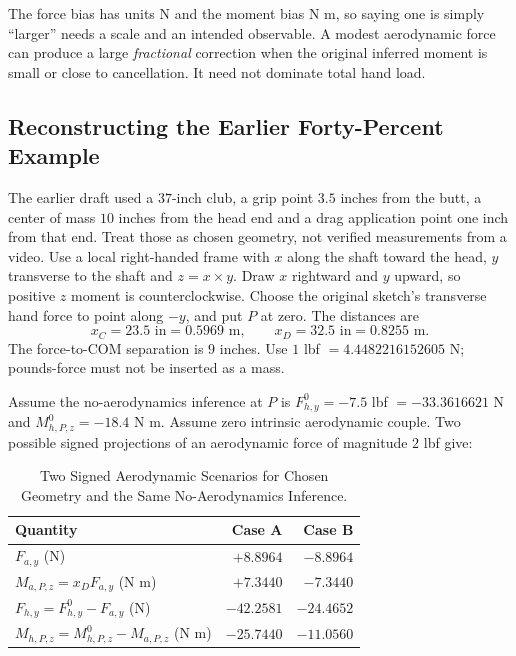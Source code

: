 \documentclass[11pt,a4paper]{article}
\begin{document}
The force bias has units N and the moment bias N m, so saying one is simply ``larger'' needs a scale and an intended observable. A modest aerodynamic force can produce a large \emph{fractional} correction when the original inferred moment is small or close to cancellation. It need not dominate total hand load.

\subsection{Reconstructing the Earlier Forty-Percent Example}
The earlier draft used a $37$-inch club, a grip point $3.5$ inches from the butt, a center of mass $10$ inches from the head end and a drag application point one inch from that end. Treat those as chosen geometry, not verified measurements from a video. Use a local right-handed frame with $x$ along the shaft toward the head, $y$ transverse to the shaft and $z=x\times y$. Draw $x$ rightward and $y$ upward, so positive $z$ moment is counterclockwise. Choose the original sketch's transverse hand force to point along $-y$, and put $P$ at zero. The distances are
\begin{equation}
x_C=23.5\text{ in}=0.5969\text{ m},\qquad
x_D=32.5\text{ in}=0.8255\text{ m}.
\end{equation}
The force-to-COM separation is $9$ inches. Use $1$ lbf $=4.4482216152605$ N; pounds-force must not be inserted as a mass.

Assume the no-aerodynamics inference at $P$ is
$F_{h,y}^0=-7.5$ lbf $=-33.3616621$ N and $M_{h,P,z}^0=-18.4$ N m.
Assume zero intrinsic aerodynamic couple. Two possible signed projections of an aerodynamic force of magnitude $2$ lbf give:
\begin{table}[htbp]\centering
\begin{tabular}{lrr}\toprule
Quantity & Case A & Case B\\\midrule
$F_{a,y}$ (N) & $+8.8964$ & $-8.8964$\\
$M_{a,P,z}=x_DF_{a,y}$ (N m) & $+7.3440$ & $-7.3440$\\
$F_{h,y}=F_{h,y}^0-F_{a,y}$ (N) & $-42.2581$ & $-24.4652$\\
$M_{h,P,z}=M_{h,P,z}^0-M_{a,P,z}$ (N m) & $-25.7440$ & $-11.0560$\\\bottomrule
\end{tabular}
\caption{Two Signed Aerodynamic Scenarios for Chosen Geometry and the Same No-Aerodynamics Inference.}
\label{tab:aerocases}\end{table}
\end{document}
